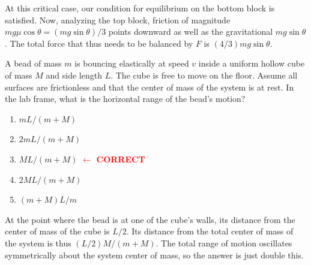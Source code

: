 \documentclass[11pt]{scrartcl}
\begin{document}
\begin{sol}
    At this critical case, our condition for equilibrium on the bottom block is satisfied. Now, analyzing the top block, friction of magnitude $mg\mu\cos\theta=(mg\sin\theta)/3$ points downward as well as the gravitational $mg\sin\theta$. The total force that thus needs to be balanced by $F$ is $(4/3)mg\sin\theta$. 
\end{sol}

\begin{prob}
    A bead of mass $m$ is bouncing elastically at speed $v$ inside a uniform hollow cube of mass $M$ and side length $L$. The cube is free to move on the floor. Assume all surfaces are frictionless and that the center of mass of the system is at rest. In the lab frame, what is the horizontal range of the bead's motion?
    \begin{enumerate}[label = (\Alph*)]
\item ${mL}/(m+M)$ 
\item ${2mL}/(m+M)$
\item ${ML}/(m+M)$ \textcolor{red}{$\leftarrow$ \textbf{CORRECT}}
\item ${2ML}/({m+M})$
\item ${(m+M)L}/{m}$
\end{enumerate}
\end{prob}

\begin{sol}
    At the point where the bead is at one of the cube's walls, its distance from the center of mass of the cube is $L/2$. Its distance from the total center of mass of the system is thus $(L/2)M/(m+M)$. The total range of motion oscillates symmetrically about the system center of mass, so the answer is just double this. 
\end{sol}
\end{document}
